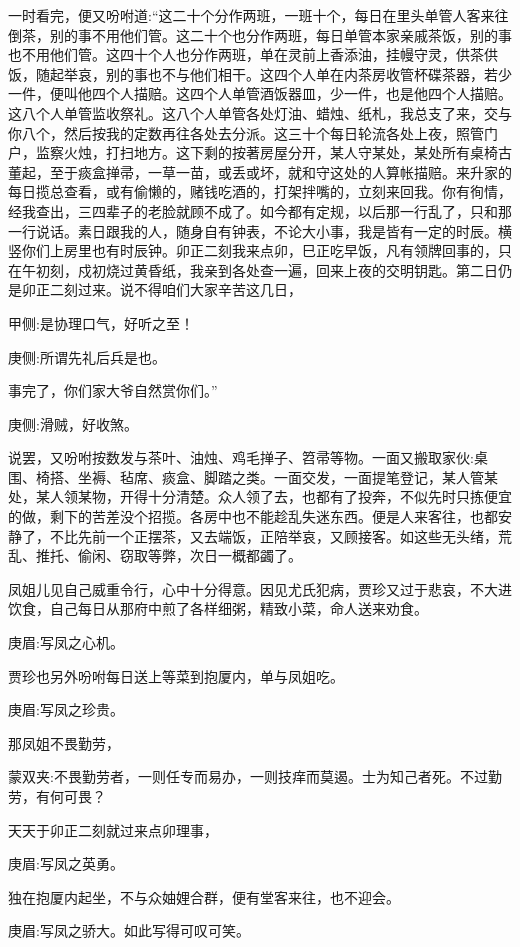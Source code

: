 \begin{parag}
    一时看完，便又吩咐道:“这二十个分作两班，一班十个，每日在里头单管人客来往倒茶，别的事不用他们管。这二十个也分作两班，每日单管本家亲戚茶饭，别的事也不用他们管。这四十个人也分作两班，单在灵前上香添油，挂幔守灵，供茶供饭，随起举哀，别的事也不与他们相干。这四个人单在内茶房收管杯碟茶器，若少一件，便叫他四个人描赔。这四个人单管酒饭器皿，少一件，也是他四个人描赔。这八个人单管监收祭礼。这八个人单管各处灯油、蜡烛、纸札，我总支了来，交与你八个，然后按我的定数再往各处去分派。这三十个每日轮流各处上夜，照管门户，监察火烛，打扫地方。这下剩的按著房屋分开，某人守某处，某处所有桌椅古董起，至于痰盒掸帚，一草一苗，或丢或坏，就和守这处的人算帐描赔。来升家的每日揽总查看，或有偷懒的，赌钱吃酒的，打架拌嘴的，立刻来回我。你有徇情，经我查出，三四辈子的老脸就顾不成了。如今都有定规，以后那一行乱了，只和那一行说话。素日跟我的人，随身自有钟表，不论大小事，我是皆有一定的时辰。横竖你们上房里也有时辰钟。卯正二刻我来点卯，巳正吃早饭，凡有领牌回事的，只在午初刻，戍初烧过黄昏纸，我亲到各处查一遍，回来上夜的交明钥匙。第二日仍是卯正二刻过来。说不得咱们大家辛苦这几日，\begin{note}甲侧:是协理口气，好听之至！\end{note}\begin{note}庚侧:所谓先礼后兵是也。\end{note}事完了，你们家大爷自然赏你们。”\begin{note}庚侧:滑贼，好收煞。\end{note}
\end{parag}


\begin{parag}
    说罢，又吩咐按数发与茶叶、油烛、鸡毛掸子、笤帚等物。一面又搬取家伙:桌围、椅搭、坐褥、毡席、痰盒、脚踏之类。一面交发，一面提笔登记，某人管某处，某人领某物，开得十分清楚。众人领了去，也都有了投奔，不似先时只拣便宜的做，剩下的苦差没个招揽。各房中也不能趁乱失迷东西。便是人来客往，也都安静了，不比先前一个正摆茶，又去端饭，正陪举哀，又顾接客。如这些无头绪，荒乱、推托、偷闲、窃取等弊，次日一概都蠲了。
\end{parag}


\begin{parag}
    凤姐儿见自己威重令行，心中十分得意。因见尤氏犯病，贾珍又过于悲哀，不大进饮食，自己每日从那府中煎了各样细粥，精致小菜，命人送来劝食。\begin{note}庚眉:写凤之心机。\end{note}贾珍也另外吩咐每日送上等菜到抱厦内，单与凤姐吃。\begin{note}庚眉:写凤之珍贵。\end{note}那凤姐不畏勤劳，\begin{note}蒙双夹:不畏勤劳者，一则任专而易办，一则技痒而莫遏。士为知己者死。不过勤劳，有何可畏？\end{note}天天于卯正二刻就过来点卯理事，\begin{note}庚眉:写凤之英勇。\end{note}独在抱厦内起坐，不与众妯娌合群，便有堂客来往，也不迎会。\begin{note}庚眉:写凤之骄大。如此写得可叹可笑。\end{note}
\end{parag}


